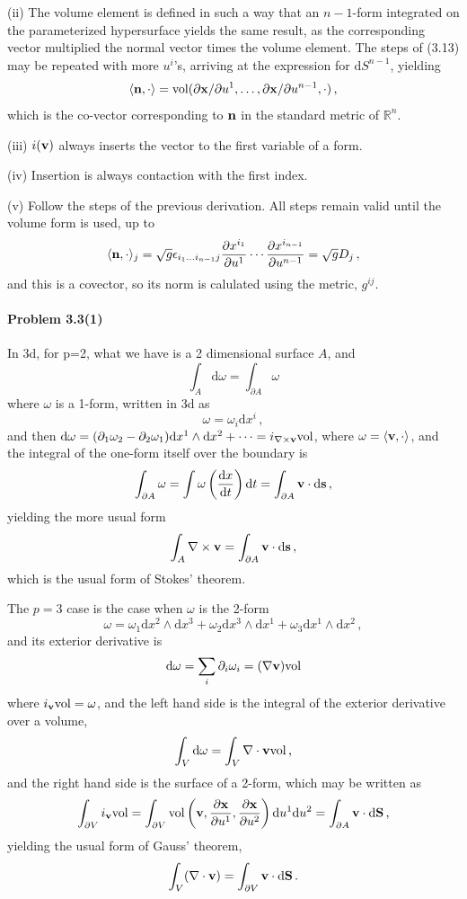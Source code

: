 \documentclass[a4paper,12pt]{article}
\def\d{\mathrm{d}}
\newcommand{\problem}[1]{\paragraph{Problem #1}}
\begin{document}
(ii) The volume element is defined in such a way that an $n-1$-form integrated on the parameterized hypersurface yields the same result, as the corresponding vector multiplied the normal vector times the volume element. The steps of (3.13) may be repeated with more $u^i$'s, arriving at the expression for $\d S^{n-1}$, yielding
\[
 \langle {\bf n}, \cdot\rangle = {\rm vol}(\partial{\bf x}/\partial u^1, \dots, \partial{\bf x}/\partial u^{n-1},\cdot)\,,
\]
which is the co-vector corresponding to ${\bf n}$ in the standard metric of $\mathbb{R}^n$.

(iii) $i({\bf v})$ always inserts the vector to the first variable of a form.

(iv) Insertion is always contaction with the first index.

(v) Follow the steps of the previous derivation. All steps remain valid until the volume form is used, up to
\[
 \langle {\bf n}, \cdot \rangle_j = \sqrt{g}\epsilon_{i_1\dots i_{n-1}j}\frac{\partial x^{i_1}}{\partial u^1}\cdots \frac{\partial x^{i_{n-1}}}{\partial u^{n-1}}=\sqrt{g}D_j\,,
\]
and this is a covector, so its norm is calulated using the metric, $g^{ij}$.



\problem{3.3(1)} In 3d, for p=2, what we have is a 2 dimensional surface $A$, and
\[
 \int_A \d \omega = \int_{\partial A}\omega
\]
where $\omega$ is a 1-form, written in 3d as
\[
 \omega = \omega_i \d x^i\,,
\]
and then
$\d \omega = (\partial_1 \omega_2 - \partial_2 \omega_1) \d x^1 \wedge \d x^2 + \cdots = i_{\nabla \times {\bf v}}{\rm vol} $, where $\omega = \langle {\bf v}, \cdot\rangle$, and the integral of the one-form itself over the boundary is
\[
 \int_{\partial A}\omega = \int \omega\left(\frac{\d x}{\d t}\right) \d t = \int_{\partial A} {\bf v}\cdot \d {\bf s}\,,
\]
yielding the more usual form
\[
 \int_{A} \nabla \times {\bf v} = \int_{\partial A}{\bf v}\cdot \d {\bf s}\,,
\]
which is the usual form of Stokes' theorem.

The $p=3$ case is the case when $\omega$ is the 2-form
\[
 \omega = \omega_1 \d x^2 \wedge \d x^3 + \omega_2 \d x^3 \wedge \d x^1 + \omega_3 \d x^1 \wedge \d x^2\,,
\]
and its exterior derivative is
\[
 \d \omega = \sum_i \partial_i \omega_i = ({\nabla \bf v}){\rm vol}
\]
where $i_{\bf v}{\rm vol} = \omega$,
and the left hand side is the integral of the exterior derivative over a volume,
\[
\int_{V} \d\omega = \int_{V}{\nabla\cdot\bf v}{\rm vol}\,,
\]
and the right hand side is the surface of a 2-form, which may be written as
\[
 \int_{\partial V} i_{\bf v}{\rm vol} = \int_{\partial V}\\{\rm vol}\left({\bf v}, \frac{\partial\bf x}{\partial u^1}, \frac{\partial\bf x}{\partial u^2}\right)\d u^1 \d u^2 = \int_{\partial A}{\bf v}\cdot \d {\bf S}\,,
\]
yielding the usual form of Gauss' theorem,
\[
 \int_{V}(\nabla\cdot{\bf v}) = \int_{\partial V}{\bf v}\cdot \d {\bf S}\,.
\]
\end{document}
